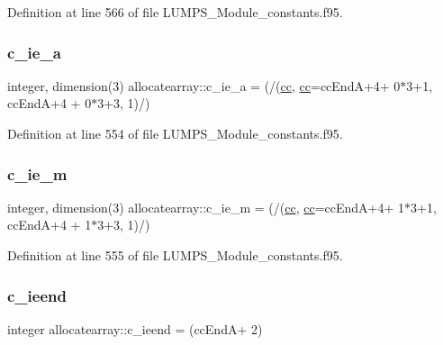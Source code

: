 Definition at line 566 of file L\+U\+M\+P\+S\+\_\+\+Module\+\_\+constants.\+f95.

\mbox{\label{namespaceallocatearray_a1c539078b4e93d885bf9e49a3908c552}} 
\subsubsection{\texorpdfstring{c\+\_\+ie\+\_\+a}{c\_ie\_a}}
{\footnotesize\ttfamily integer, dimension(3) allocatearray\+::c\+\_\+ie\+\_\+a = (/(\hyperlink{namespaceallocatearray_ac863c81704eb507dee10f5e10741e10c}{cc}, \hyperlink{namespaceallocatearray_ac863c81704eb507dee10f5e10741e10c}{cc}=cc\+EndA+4+ 0$\ast$3+1, cc\+EndA+4 + 0$\ast$3+3, 1)/)}



Definition at line 554 of file L\+U\+M\+P\+S\+\_\+\+Module\+\_\+constants.\+f95.

\mbox{\label{namespaceallocatearray_a3f96e74f855b27cc4f66bac31735ba2b}} 
\subsubsection{\texorpdfstring{c\+\_\+ie\+\_\+m}{c\_ie\_m}}
{\footnotesize\ttfamily integer, dimension(3) allocatearray\+::c\+\_\+ie\+\_\+m = (/(\hyperlink{namespaceallocatearray_ac863c81704eb507dee10f5e10741e10c}{cc}, \hyperlink{namespaceallocatearray_ac863c81704eb507dee10f5e10741e10c}{cc}=cc\+EndA+4+ 1$\ast$3+1, cc\+EndA+4 + 1$\ast$3+3, 1)/)}



Definition at line 555 of file L\+U\+M\+P\+S\+\_\+\+Module\+\_\+constants.\+f95.

\mbox{\label{namespaceallocatearray_aac513d5c2f6bd570ee8ece0bd5d55d11}} 
\subsubsection{\texorpdfstring{c\+\_\+ieend}{c\_ieend}}
{\footnotesize\ttfamily integer allocatearray\+::c\+\_\+ieend = (cc\+EndA+ 2)}




